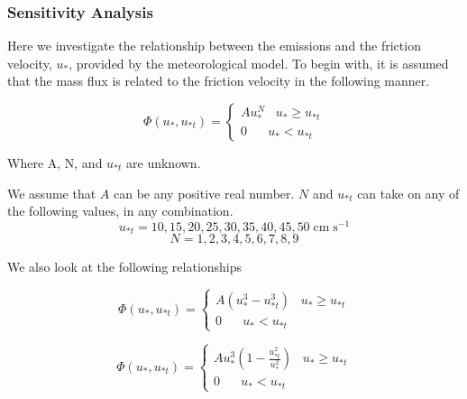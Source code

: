 \subsubsection{Sensitivity Analysis}

Here we investigate the relationship between the emissions and the friction velocity, $u_*$, provided by the meteorological model.
To begin with, it is assumed that the mass flux is related to the friction velocity in the following manner.

\begin{equation}
\Phi(u_*, u_{*t}) =\begin{cases}
Au_*^N \;\;\; u_{*} \geq u_{*t} \\
0 \;\;\;\;\;\;  u_* < u_{*t} 
\end{cases}
\label{eq:massflux}
\end{equation}

Where A, N, and $u_{*t}$ are unknown. 

We assume that $A$ can be any
positive real number. $N$ and $u_{*t}$ can take on any of the following values, in any combination.
$$ u_{*t} = 10,15,20,25,30,35,40,45,50 \; \mathrm{cm} \; \mathrm{s}^{-1}$$
$$ N = 1,2,3,4,5,6,7,8,9 $$

We also look at the following relationships

\begin{equation}
\Phi(u_*, u_{*t}) =\begin{cases}
A(u_*^3 - u_{*t}^3)  \;\;\; u_{*} \geq u_{*t} \\
0 \;\;\;\;\;\;  u_* < u_{*t} 
\end{cases}
\label{eq:leadbetter}
\end{equation}


\begin{equation}
\Phi(u_*, u_{*t}) =\begin{cases}
Au_*^3 (1-\frac{u_{*t}^2}{u_{*}^2})  \;\;\; u_{*} \geq u_{*t} \\
0 \;\;\;\;\;\;  u_* < u_{*t} 
\end{cases}
\label{eq:shao}
\end{equation}

